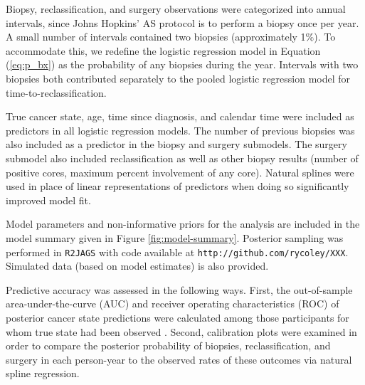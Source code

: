 \documentclass[12pt, letterpaper]{article}
\begin{document}
Biopsy, reclassification, and surgery observations were categorized into annual intervals, since Johns Hopkins' AS protocol is to perform a biopsy once per year. A small number of intervals contained two biopsies (approximately 1$\%$). To accommodate this, we redefine the logistic regression model in Equation (\ref{eq:p_bx}) as the probability of any biopsies during the year. Intervals with two biopsies both contributed separately to the pooled logistic regression model for time-to-reclassification. 

True cancer state, age, time since diagnosis, and calendar time were included as predictors in all logistic regression models. The number of previous biopsies was also included as a predictor in the biopsy and surgery submodels. The surgery submodel also included reclassification as well as other biopsy results (number of positive cores, maximum percent involvement of any core). Natural splines  were used in place of linear representations of predictors when doing so significantly improved model fit.

Model parameters and non-informative priors for the analysis are included in the model summary given in Figure \ref{fig:model-summary}. Posterior sampling was performed in \texttt{R2JAGS} with code available at \texttt{http://github.com/rycoley/XXX}. Simulated data (based on model estimates) is also provided.

Predictive accuracy was assessed in the following ways. First, the out-of-sample area-under-the-curve (AUC) and receiver operating characteristics (ROC) of posterior cancer state predictions were calculated among those participants for whom true state had been observed \cite{Hosmer2013}. Second, calibration plots were examined in order to compare the posterior probability of biopsies, reclassification, and surgery in each person-year to the observed rates of these outcomes via natural spline regression.
\end{document}
